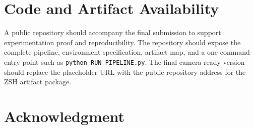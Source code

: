 \documentclass{ieeeaccess}
\begin{document}
\section*{Code and Artifact Availability}

A public repository should accompany the final submission to support experimentation proof and reproducibility. The repository should expose the complete pipeline, environment specification, artifact map, and a one-command entry point such as \texttt{python RUN\_PIPELINE.py}. The final camera-ready version should replace the placeholder URL with the public repository address for the ZSH artifact package.

\section*{Acknowledgment}
\end{document}
